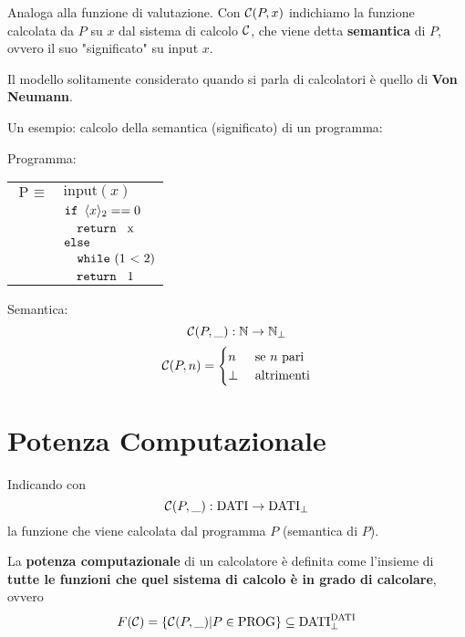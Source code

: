 Analoga alla funzione di valutazione. Con $\mathcal{C}(P,x)$ indichiamo la funzione calcolata da $P$ su $x$ dal sistema di calcolo $\mathcal{C}$, che viene detta \textbf{semantica} di $P$, ovvero il suo "significato" su input $x$.

Il modello solitamente considerato quando si parla di calcolatori è quello di \textbf{Von Neumann}.

Un esempio: calcolo della semantica (significato) di un programma:

\begin{minipage}{0.45\textwidth}
    Programma:
    \begin{center}
        \begin{tabular}{r|l|}
            \cline{2-2}
            $\text{P } \equiv$	& $\text{input}(x)$ \\
            & $\text{\texttt{if }} \langle x \rangle_2 == 0$ \\
            & $\quad \text{\texttt{return } x}$ \\
            & $\text{\texttt{else}}$ \\
            & $\quad \text{\texttt{while} (1 < 2)}$\\
            & $\quad \text{\texttt{return } 1}$ \\
            \cline{2-2}
        \end{tabular}
    \end{center}
\end{minipage}
\hfill 
\begin{minipage}{0.45\textwidth}
    Semantica:
    $$ \mathcal{C} (P, \_): \mathbb{N} \rightarrow \mathbb{N}_\bot $$
    $$ \mathcal{C} (P, n) = \begin{cases}
        n & \text{ se } n \text{ pari} \\
        \bot & \text{ altrimenti}
    \end{cases}$$
\end{minipage}

\section{Potenza Computazionale}

Indicando con 
$$ \mathcal{C} (P, \_): \text{DATI} \rightarrow \text{DATI}_{\bot} $$
la funzione che viene calcolata dal programma $P$ (semantica di $P$).

La \textbf{potenza computazionale} di un calcolatore è definita come l'insieme di \textbf{tutte le funzioni che quel sistema di calcolo è in grado di calcolare}, ovvero
$$ F(\mathcal{C}) = \{\mathcal{C} (P, \_) | P \in \text{PROG}\} \subseteq \text{DATI}_\bot^{\text{DATI}} $$

